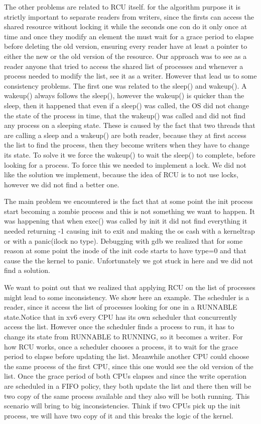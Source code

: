 \documentclass[10pt,a4]{article}
\begin{document}
The other problems are related to RCU itself. for the algorithm purpose it is strictly important to separate readers from writers, since the firsts can access the shared resource without locking it while the seconds one con do it only once at time and once they modify an element the must wait for a grace period to elapse before deleting the old version, ensuring every reader have at least a pointer to either the new or the old version of the resource.
Our approach was to see as a reader anyone that tried to access the shared list of processes and whenever a process needed to modify the list, see it as a writer. However that lead us to some consistency problems.
The first one was related to the sleep() and wakeup(). A wakeup() always follows the sleep(), however the wakeup() is quicker than the sleep, then it happened that even if a sleep() was called, the OS did not change the state of the process in time, that the wakeup() was called and did not find any process on a sleeping state. These is caused by the fact that two threads that are calling a sleep and a wakeup() are both reader, because they at first access the list to find the process, then they become writers when they have to change its state. To solve it we force the  wakeup() to wait the sleep()  to complete, before looking for a process. To force this we needed to implement a lock. We did not like the solution we implement, because the idea of RCU is to not use locks, however we did not find a better one.


The main problem we encountered is the fact that at some point the init process start becoming a zombie process and this is not something we want to happen. It was happening that when exec() was called by init it did not find everything it needed returning -1 causing init to exit and making the os cash with a kerneltrap or with a panic(ilock no type). Debugging with gdb we realized that for some reason at some point the inode of the init code starts to have type=0 and that cause the the kernel to panic. Unfortunately we got stuck in here and we did not find a solution.

We want to point out that we realized that applying RCU on the list of processes might lead to some inconsistency. We show here an example. The scheduler is a reader, since it access the list of processes looking for one in a RUNNABLE state.Notice that in xv6 every CPU has its own scheduler that concurrently access the list. However once the scheduler finds a process to run, it has to change its state from RUNNABLE to RUNNING, so it becomes a writer. For how RCU works, once a scheduler chooses a process, it to wait for the grace period to elapse before updating the list. Meanwhile another CPU could choose the same process of the first CPU, since this one would see the old version of the list. Once the grace period of both CPUs elapses and since the write operation are scheduled in a FIFO policy, they both update the list and there then will be two copy of the same process available and they also will be both running. This scenario will bring to big inconsistencies. Think if two CPUs pick up the init process, we will have two copy of it and this breaks the logic of the kernel. 
\end{document}
